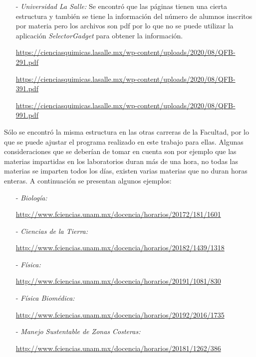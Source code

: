 \begin{itemize}
\item[-] \textit{Universidad La Salle:} Se encontró que las páginas tienen una cierta estructura y también se tiene la información del número de alumnos inscritos por materia pero los archivos son pdf por lo que no se puede utilizar la aplicación \textit{SelectorGadget} para obtener la información.

\url{https://cienciasquimicas.lasalle.mx/wp-content/uploads/2020/08/QFB-291.pdf}

\url{https://cienciasquimicas.lasalle.mx/wp-content/uploads/2020/08/QFB-391.pdf}

\url{https://cienciasquimicas.lasalle.mx/wp-content/uploads/2020/08/QFB-991.pdf}


%
%

\end{itemize}

Sólo se encontró la misma estructura en las otras carreras de la Facultad, por lo que se puede ajustar el programa realizado en este trabajo para ellas. Algunas consideraciones que se deberían de tomar en cuenta son por ejemplo que las materias impartidas en los laboratorios duran más de una hora, no todas las materias se imparten todos los días, existen varias materias que no duran horas enteras. A continuación se presentan algunos ejemplos:

\begin{itemize}
\item[-] \textit{Biología:}

\url{http://www.fciencias.unam.mx/docencia/horarios/20172/181/1601}

\item[-] \textit{Ciencias de la Tierra:}

\url{http://www.fciencias.unam.mx/docencia/horarios/20182/1439/1318}

\item[-] \textit{Física:}

\url{http://www.fciencias.unam.mx/docencia/horarios/20191/1081/830}

\item[-] \textit{Física Biomédica:}

\url{http://www.fciencias.unam.mx/docencia/horarios/20192/2016/1735}

\item[-] \textit{Manejo Sustentable de Zonas Costeras:}

\url{http://www.fciencias.unam.mx/docencia/horarios/20181/1262/386}

\end{itemize}

